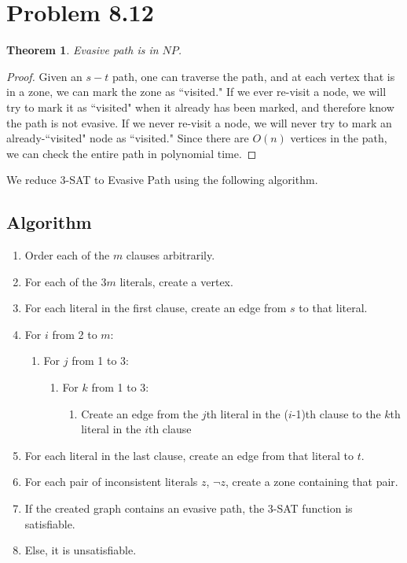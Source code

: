 \documentclass{article}
\newtheorem{theorem}{Theorem}[section]
\begin{document}
\section{Problem 8.12}
\begin{theorem}
Evasive path is in $NP$.
\end{theorem}
\begin{proof}
Given an $s-t$ path, one can traverse the path, and at each vertex that is in a zone, we can mark the zone as ``visited." If we ever re-visit a node, we will try to mark it as ``visited" when it already has been marked, and therefore know the path is not evasive. If we never re-visit a node, we will never try to mark an already-``visited" node as ``visited." Since there are $O(n)$ vertices in the path, we can check the entire path in polynomial time.
\end{proof}

We reduce 3-SAT to Evasive Path using the following algorithm.
\subsection{Algorithm}
\begin{enumerate}
\item Order each of the $m$ clauses arbitrarily.
\item For each of the 3$m$ literals, create a vertex.
\item For each literal in the first clause, create an edge from $s$ to that literal.
\item For $i$ from 2 to $m$:
\begin{enumerate}
\item For $j$ from 1 to 3:
\begin{enumerate}
\item For $k$ from 1 to 3:
\begin{enumerate}
\item Create an edge from the $j$th literal in the ($i$-1)th clause to the $k$th literal in the $i$th clause
\end{enumerate}
\end{enumerate}
\end{enumerate}
\item For each literal in the last clause, create an edge from that literal to $t$.
\item For each pair of inconsistent literals $z$, $\neg z$, create a zone containing that pair.
\item If the created graph contains an evasive path, the 3-SAT function is satisfiable.
\item Else, it is unsatisfiable.
\end{enumerate}
\end{document}
